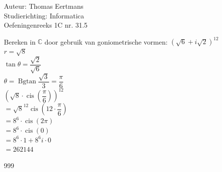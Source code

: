 \documentclass[a4paper]{article}
\begin{document}
  
\noindent \large Auteur: Thomas Eertmans \\
\noindent \large Studierichting: Informatica\\
\noindent \large Oefeningenreeks 1C nr. 31.5\\
\newcommand{\Bgtan}{\operatorname{Bgtan}}
\newcommand{\cis}{\operatorname{cis}}
\medskip

\normalsize

Bereken in $\mathbb{C}$ door gebruik van goniometrische vormen: $\left(\sqrt{6}+i\sqrt{2}\right)^{12}$ \\

$r = \sqrt{8}$ \\

$\tan \theta = \dfrac{\sqrt{2}}{\sqrt{6}}$ \\

$\theta = \Bgtan \dfrac{\sqrt{3}}{3} = \dfrac{\pi}{6}$ \\

$\left(\sqrt{8} \cdot \cis \left(\dfrac{\pi}{6}\right)\right)^{12}$ \\

$= \sqrt{8}^{12} \cis \left(12 \cdot \dfrac{\pi}{6}\right)$ \\

$= 8^6 \cdot \cis ( 2\pi)$ \\

$= 8^6 \cdot \cis (0)$ \\

$= 8^6 \cdot 1 + 8^6i \cdot 0$ \\

$= 262144$ \\

\begin{thebibliography}{999}
\end{thebibliography}
\end{document}

